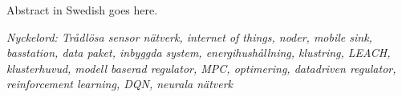 Abstract in Swedish goes here. \newline


\noindent \textit{Nyckelord: Trådlösa sensor nätverk, internet of things, noder, mobile sink, basstation, data paket, inbyggda system, energihushållning, klustring, LEACH, klusterhuvud, modell baserad regulator, MPC, optimering, datadriven regulator, reinforcement learning, DQN, neurala nätverk}

